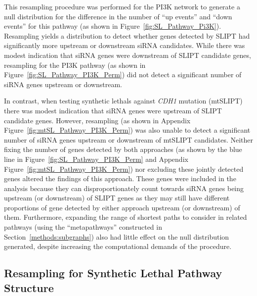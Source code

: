 This resampling procedure was performed for the \gls{PI3K} network to generate a null distribution for the difference in the number of ``up events'' and ``down events'' for this pathway (as shown in Figure~\ref{fig:SL_Pathway_Pi3K}). Resampling yields a distribution to detect whether genes detected by \gls{SLIPT} had significantly more upstream or downstream \gls{siRNA} candidates. While there was modest indication that \gls{siRNA} genes were downstream of \gls{SLIPT} candidate genes, resampling for the \gls{PI3K} pathway (as shown in Figure~\ref{fig:SL_Pathway_PI3K_Perm}) did not detect a significant number of \gls{siRNA} genes upstream or downstream.

In contrast, when testing \glspl{synthetic lethal} against \textit{CDH1} \gls{mutation} (\acrshort{mtSLIPT}) there was modest indication that \gls{siRNA} genes were upstream of \gls{SLIPT} candidate genes. However, resampling (as shown in Appendix Figure~\ref{fig:mtSL_Pathway_PI3K_Perm}) was also unable to detect a significant number of \gls{siRNA} genes upstream or downstream of \acrshort{mtSLIPT} candidates. Neither fixing the number of genes detected by both approaches (as shown by the blue line in Figure~\ref{fig:SL_Pathway_PI3K_Perm} and Appendix Figure~\ref{fig:mtSL_Pathway_PI3K_Perm}) nor excluding these jointly detected genes altered the findings of this approach. These genes were included in the analysis because they can disproportionately count towards \gls{siRNA} genes being upstream (or downstream) of \gls{SLIPT} genes as they may still have different proportions of gene detected by either approach upstream (or downstream) of them. Furthermore, expanding the range of \glspl{shortest path} to consider  in related pathways (using the ``metapathways'' constructed in Section~\ref{methods:subgraphs}) also had little effect on the null distribution generated, despite increasing the computational demands of the procedure.


\FloatBarrier

\subsection{Resampling for Synthetic Lethal Pathway Structure}  \label{chapt4:Structure_Perm}

